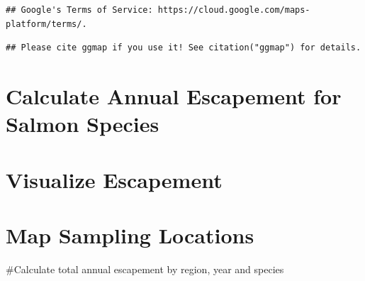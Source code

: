 \documentclass[]{article}
\newenvironment{Shaded}{\begin{snugshade}}{\end{snugshade}}
\newcommand{\DataTypeTok}[1]{\textcolor[rgb]{0.13,0.29,0.53}{#1}}
\newcommand{\KeywordTok}[1]{\textcolor[rgb]{0.13,0.29,0.53}{\textbf{#1}}}
\newcommand{\NormalTok}[1]{#1}
\newcommand{\StringTok}[1]{\textcolor[rgb]{0.31,0.60,0.02}{#1}}
\begin{document}
\begin{verbatim}
## Google's Terms of Service: https://cloud.google.com/maps-platform/terms/.
\end{verbatim}

\begin{verbatim}
## Please cite ggmap if you use it! See citation("ggmap") for details.
\end{verbatim}

\begin{Shaded}
\end{Shaded}

\hypertarget{calculate-annual-escapement-for-salmon-species}{%
\section{Calculate Annual Escapement for Salmon
Species}\label{calculate-annual-escapement-for-salmon-species}}

\hypertarget{visualize-escapement}{%
\section{Visualize Escapement}\label{visualize-escapement}}

\hypertarget{map-sampling-locations}{%
\section{Map Sampling Locations}\label{map-sampling-locations}}

\#Calculate total annual escapement by region, year and species
\end{document}
